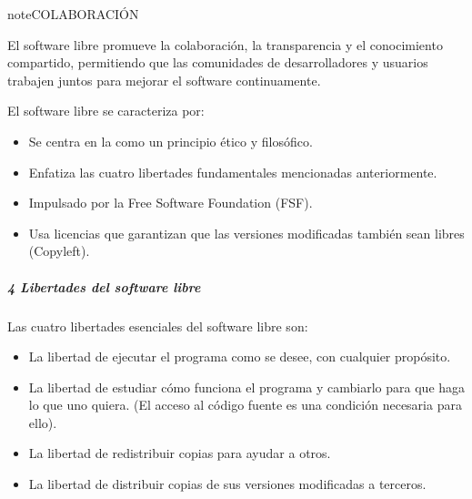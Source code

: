 \documentclass[letterpaper,10pt,spanish]{sphinxmanual}
\begin{document}
\begin{sphinxadmonition}{note}{COLABORACIÓN}

\sphinxAtStartPar
El software libre promueve la colaboración, la transparencia y el conocimiento compartido, permitiendo que las comunidades de desarrolladores y usuarios trabajen juntos para mejorar el software continuamente.
\end{sphinxadmonition}

\sphinxAtStartPar
El software libre se caracteriza por:
\begin{itemize}
\item {} 
\sphinxAtStartPar
Se centra en la  como un principio ético y filosófico.

\item {} 
\sphinxAtStartPar
Enfatiza las cuatro libertades fundamentales mencionadas anteriormente.

\item {} 
\sphinxAtStartPar
Impulsado por la Free Software Foundation (FSF).

\item {} 
\sphinxAtStartPar
Usa licencias que garantizan que las versiones modificadas también sean libres (Copyleft).

\end{itemize}


\subparagraph{4 Libertades del software libre}
\label{\detokenize{cursos/ofimatica10/recursos/T02:libertades-del-software-libre}}
\sphinxAtStartPar
\sphinxfootnotemark[2] Las cuatro libertades esenciales del software libre son:
\begin{itemize}
\item {} 
\sphinxAtStartPar
{} La libertad de ejecutar el programa como se desee, con cualquier propósito.

\item {} 
\sphinxAtStartPar
{} La libertad de estudiar cómo funciona el programa y cambiarlo para que haga lo que uno quiera. (El acceso al código fuente es una condición necesaria para ello).

\item {} 
\sphinxAtStartPar
{} La libertad de redistribuir copias para ayudar a otros.

\item {} 
\sphinxAtStartPar
{} La libertad de distribuir copias de sus versiones modificadas a terceros.

\end{itemize}
\end{document}
